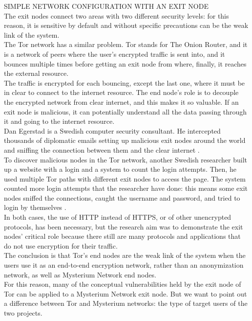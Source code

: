 \documentclass[12pt]{article}
\begin{document}
	SIMPLE NETWORK CONFIGURATION WITH AN EXIT NODE\\

	The exit nodes connect two areas with two different security levels: for this reason, it is sensitive by default and without specific precautions can be the weak link of the system.\\
	The Tor network has a similar problem. Tor stands for The Onion Router, and it is a network of peers where the user's encrypted traffic is sent into, and it bounces multiple times before getting an exit node from where, finally, it reaches the external resource.\\
	The traffic is encrypted for each bouncing, except the last one, where it must be in clear to connect to the internet resource. The end node's role is to decouple the encrypted network from clear internet, and this makes it so valuable. If an exit node is malicious, it can potentially understand all the data passing through it and going to the internet resource.\\
	Dan Egerstad is a Swedish computer security consultant. He intercepted thousands of diplomatic emails setting up malicious exit nodes around the world and sniffing the connection between them and the clear internet \cite{exitnodeTOR}.\\
	To discover malicious nodes in the Tor network, another Swedish researcher built up a website with a login and a system to count the login attempts. Then, he used multiple Tor paths with different exit nodes to access the page. The system counted more login attempts that the researcher have done: this means some exit nodes sniffed the connections, caught the username and password, and tried to login by themselves \cite{exitnodeTOR2}.\\
	In both cases, the use of HTTP instead of HTTPS, or of other unencrypted protocols, has been necessary, but the research aim was to demonstrate the exit nodes' critical role because there still are many protocols and applications that do not use encryption for their traffic.\\
	The conclusion is that Tor's end nodes are the weak link of the system when the users use it as an end-to-end encryption network, rather than an anonymization network, as well as Mysterium Network end nodes.\\
	For this reason, many of the conceptual vulnerabilities held by the exit node of Tor can be applied to a Mysterium Network exit node. But we want to point out a difference between Tor and Mysterium networks: the type of target users of the two projects.\\
\end{document}
